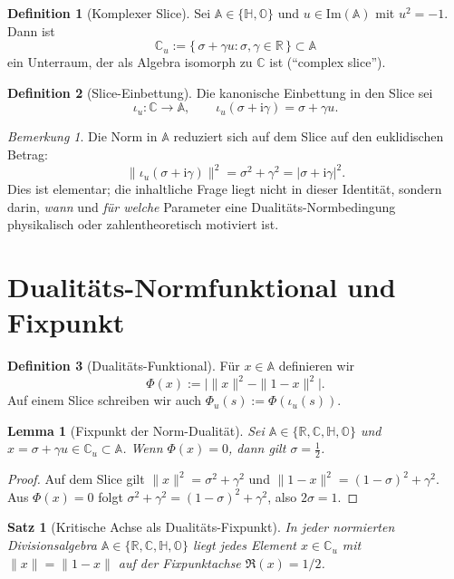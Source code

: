 \documentclass[11pt,a4paper]{article}
\theoremstyle{plain}
\newtheorem{satz}{Satz}
\newtheorem{lemma}{Lemma}
\theoremstyle{definition}
\newtheorem{definition}{Definition}
\theoremstyle{remark}
\newtheorem{bemerkung}{Bemerkung}
\newcommand{\C}{\mathbb{C}}
\newcommand{\R}{\mathbb{R}}
\newcommand{\Hh}{\mathbb{H}}
\newcommand{\Okt}{\mathbb{O}}
\newcommand{\ii}{\mathrm{i}}
\begin{document}
\begin{definition}[Komplexer Slice]
Sei $\mathbb{A}\in\{\Hh,\Okt\}$ und $u\in\mathrm{Im}(\mathbb{A})$ mit $u^2=-1$.
Dann ist
\[
\C_u := \{\,\sigma + \gamma u : \sigma,\gamma\in\R\,\}\subset\mathbb{A}
\]
ein Unterraum, der als Algebra isomorph zu $\C$ ist (``complex slice'').
\end{definition}

\begin{definition}[Slice-Einbettung]
Die kanonische Einbettung in den Slice sei
\[
\iota_u:\C\to\mathbb{A},\qquad \iota_u(\sigma+\ii\gamma)=\sigma+\gamma u.
\]
\end{definition}

\begin{bemerkung}
Die Norm in $\mathbb{A}$ reduziert sich auf dem Slice auf den euklidischen Betrag:
\[
\|\iota_u(\sigma+\ii\gamma)\|^2 = \sigma^2+\gamma^2 = |\sigma+\ii\gamma|^2.
\]
Dies ist elementar; die inhaltliche Frage liegt nicht in dieser Identit\"at, sondern darin,
\emph{wann} und \emph{f\"ur welche} Parameter eine Dualit\"ats-Normbedingung physikalisch oder
zahlentheoretisch motiviert ist.
\end{bemerkung}

\section{Dualit\"ats-Normfunktional und Fixpunkt}

\begin{definition}[Dualit\"ats-Funktional]
F\"ur $x\in\mathbb{A}$ definieren wir
\[
\Phi(x) := \big|\|x\|^2-\|1-x\|^2\big|.
\]
Auf einem Slice schreiben wir auch $\Phi_u(s):=\Phi(\iota_u(s))$.
\end{definition}

\begin{lemma}[Fixpunkt der Norm-Dualit\"at]\label{lem:fixpoint}
Sei $\mathbb{A}\in\{\R,\C,\Hh,\Okt\}$ und $x=\sigma+\gamma u\in\C_u\subset\mathbb{A}$.
Wenn $\Phi(x)=0$, dann gilt $\sigma=\tfrac12$.
\end{lemma}

\begin{proof}
Auf dem Slice gilt $\|x\|^2=\sigma^2+\gamma^2$ und $\|1-x\|^2=(1-\sigma)^2+\gamma^2$.
Aus $\Phi(x)=0$ folgt $\sigma^2+\gamma^2=(1-\sigma)^2+\gamma^2$, also $2\sigma=1$.
\end{proof}

\begin{satz}[Kritische Achse als Dualit\"ats-Fixpunkt]\label{thm:critical_axis}
In jeder normierten Divisionsalgebra $\mathbb{A}\in\{\R,\C,\Hh,\Okt\}$ liegt jedes Element
$x\in\C_u$ mit $\|x\|=\|1-x\|$ auf der Fixpunktachse $\Re(x)=1/2$.
\end{satz}
\end{document}

